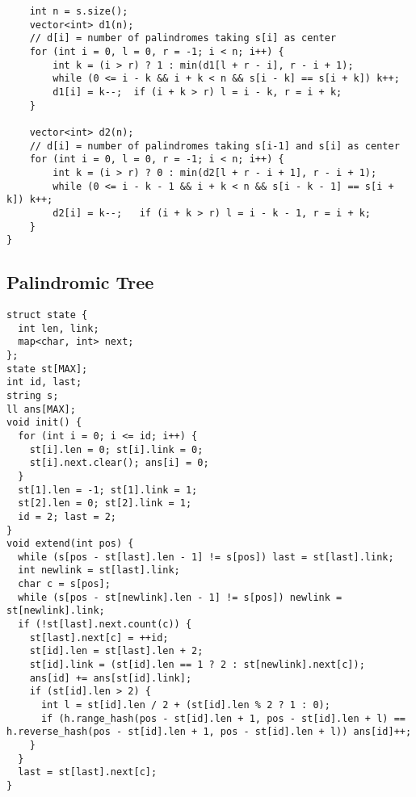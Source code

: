 \documentclass[FSZ,a4paper,onesided]{article}
\begin{document}
\begin{multicols*}{\COLS}
\begin{lstlisting}
    int n = s.size();
    vector<int> d1(n);
    // d[i] = number of palindromes taking s[i] as center
    for (int i = 0, l = 0, r = -1; i < n; i++) {
        int k = (i > r) ? 1 : min(d1[l + r - i], r - i + 1);
        while (0 <= i - k && i + k < n && s[i - k] == s[i + k]) k++;
        d1[i] = k--;  if (i + k > r) l = i - k, r = i + k;
    }

    vector<int> d2(n);
    // d[i] = number of palindromes taking s[i-1] and s[i] as center
    for (int i = 0, l = 0, r = -1; i < n; i++) {
        int k = (i > r) ? 0 : min(d2[l + r - i + 1], r - i + 1);
        while (0 <= i - k - 1 && i + k < n && s[i - k - 1] == s[i + k]) k++;
        d2[i] = k--;   if (i + k > r) l = i - k - 1, r = i + k;
    }
}
\end{lstlisting}
\subsection{Palindromic Tree}
\begin{lstlisting}
struct state {
  int len, link;
  map<char, int> next;
};
state st[MAX];
int id, last;
string s;
ll ans[MAX];
void init() {
  for (int i = 0; i <= id; i++) {
    st[i].len = 0; st[i].link = 0;
    st[i].next.clear(); ans[i] = 0;
  }
  st[1].len = -1; st[1].link = 1;
  st[2].len = 0; st[2].link = 1;
  id = 2; last = 2;
}
void extend(int pos) {
  while (s[pos - st[last].len - 1] != s[pos]) last = st[last].link;
  int newlink = st[last].link;
  char c = s[pos];
  while (s[pos - st[newlink].len - 1] != s[pos]) newlink = st[newlink].link;
  if (!st[last].next.count(c)) {
    st[last].next[c] = ++id;
    st[id].len = st[last].len + 2;
    st[id].link = (st[id].len == 1 ? 2 : st[newlink].next[c]);
    ans[id] += ans[st[id].link];
    if (st[id].len > 2) {
      int l = st[id].len / 2 + (st[id].len % 2 ? 1 : 0);
      if (h.range_hash(pos - st[id].len + 1, pos - st[id].len + l) == h.reverse_hash(pos - st[id].len + 1, pos - st[id].len + l)) ans[id]++;
    }
  }
  last = st[last].next[c];
}
\end{lstlisting}

\end{multicols*}
\end{document}

